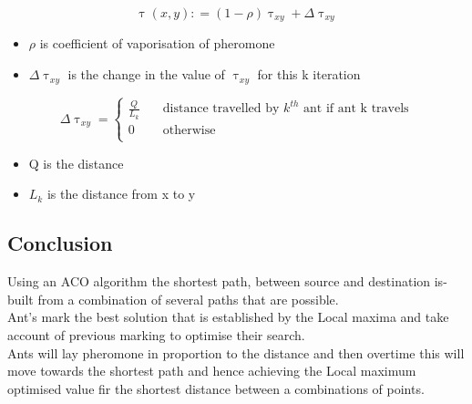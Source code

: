 \documentclass[11pt]{article}
\begin{document}
\begin{center}
\Large
\begin{equation}
\uptau(x,y) \mathrel{\mathop:}=(1 - \rho)\uptau_{xy} + \Delta\uptau_{xy}
\end{equation}
\end{center}
\begin{itemize} %
\item[]\hspace{6cm}$\rho$ is coefficient of vaporisation of pheromone
\item[] \hspace*{6cm}$\Delta\uptau_{xy}$ is the change in the value of $\uptau_{xy}$ for this k iteration
\end{itemize}
\newpage
\begin{center}
\Large
\[   
\Delta\uptau_{xy} = 
     \begin{cases}
       \frac{Q}{L_k} &\quad\text{distance travelled by $k^{th}$ ant if ant k travels} \\
       \text{0} &\quad\text{otherwise}\\
     \end{cases}
\]
\begin{itemize} %
\item[]\hspace{6cm}Q is the distance
\item[] \hspace*{6cm}$L_k$ is the distance from x to y
\end{itemize}

\end{center}

\subsection{Conclusion}
Using an ACO algorithm the shortest path, between source and destination is-built from a combination of several paths that are possible. \\
Ant's mark the best solution that is established by the Local maxima and take account of previous marking to optimise their search.\\
Ants will lay pheromone in proportion to the distance and then overtime this will move towards the shortest path and hence achieving the Local maximum optimised value fir the shortest distance between a combinations of points.
\end{document}
